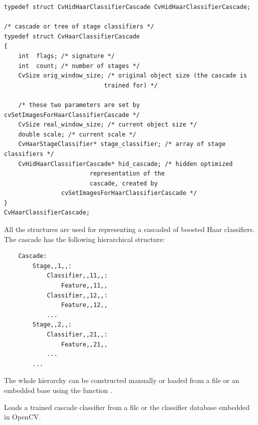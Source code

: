\begin{lstlisting}
typedef struct CvHidHaarClassifierCascade CvHidHaarClassifierCascade;

/* cascade or tree of stage classifiers */
typedef struct CvHaarClassifierCascade
{
    int  flags; /* signature */
    int  count; /* number of stages */
    CvSize orig_window_size; /* original object size (the cascade is
                            trained for) */

    /* these two parameters are set by cvSetImagesForHaarClassifierCascade */
    CvSize real_window_size; /* current object size */
    double scale; /* current scale */
    CvHaarStageClassifier* stage_classifier; /* array of stage classifiers */
    CvHidHaarClassifierCascade* hid_cascade; /* hidden optimized
                        representation of the
                        cascade, created by
                cvSetImagesForHaarClassifierCascade */
}
CvHaarClassifierCascade;
\end{lstlisting}

All the structures are used for representing a cascaded of boosted Haar classifiers. The cascade has the following hierarchical structure:

\begin{verbatim}
    Cascade:
        Stage,,1,,:
            Classifier,,11,,:
                Feature,,11,,
            Classifier,,12,,:
                Feature,,12,,
            ...
        Stage,,2,,:
            Classifier,,21,,:
                Feature,,21,,
            ...
        ...
\end{verbatim}

The whole hierarchy can be constructed manually or loaded from a file or an embedded base using the function .

Loads a trained cascade classifier from a file or the classifier database embedded in OpenCV.


\begin{description}
\end{description}

